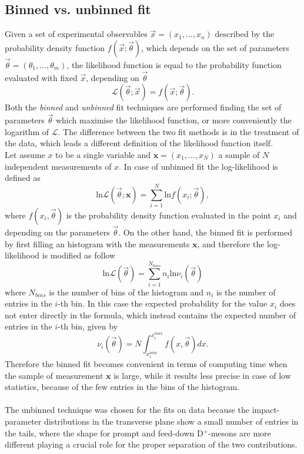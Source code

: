 \documentclass[b5paper,10pt,twoside,oldstyle,classica]{toptesi}
\begin{document}
\subsection{Binned vs. unbinned fit}
Given a set of experimental observables $\vec{x}=(x_1,...,x_n)$ described by the probability density function $f(\vec{x}; \vec{\theta})$, which depends on the set of parameters $\vec{\theta} = (\theta_1,...,\theta_m)$, the likelihood function is equal to the probability function evaluated with fixed $\vec{x}$, depending on $\vec{\theta}$
\begin{equation}
 \mathcal{L}(\vec{\theta}; \vec{x}) = f(\vec{x}; \vec{\theta}).
\end{equation}
Both the \textit{binned} and \textit{unbinned} fit techniques are performed finding the set of parameters $\vec{\theta}$ which maximise the likelihood function, or more conveniently the logarithm of $\mathcal{L}$. 
The difference between the two fit methods is in the treatment of the data, which leads a different definition of the likelihood function itself.\\ Let assume $x$ to be a single variable and $\pmb{x}=(x_1,...,x_N)$ a sample of $N$ independent measurements of $x$. In case of unbinned fit the log-likelihood is defined as
\begin{equation}
\text{ln}\mathcal{L}(\vec{\theta}; \pmb{x}) = \sum_{i=1}^{N} \text{ln}f(x_i; \vec{\theta}),
\end{equation}
where $f(x_i,\vec{\theta})$ is the probability density function evaluated in the point $x_i$ and depending on the parameters $\vec{\theta}$.
On the other hand, the binned fit is performed by first filling an histogram with the measurements $\pmb{x}$, and therefore the log-likelihood is modified as follow
\begin{equation}
 \text{ln}\mathcal{L}(\vec{\theta}) = \sum_{i=1}^{N_{bins}} n_i\text{ln}\nu_i(\vec{\theta})
\end{equation}
where $N_{bins}$ is the number of bins of the histogram and $n_i$ is the number of entries in the $i$-th bin. In this case the expected probability for the value $x_i$ does not enter directly in the formula, which instead contains the expected number of entries in the $i$-th bin, given by
\begin{equation}
 \nu_i(\vec{\theta}) = N\int_{x_i^{min}}^{x_i^{max}}f(x,\vec{\theta})dx.
\end{equation}
Therefore the binned fit becomes convenient in terms of computing time when the sample of measurement $\pmb{x}$ is large, while it results less precise in case of low statistics, because of the few entries in the bins of the histogram.\\\\
The unbinned technique was chosen for the fits on data because the impact-parameter distributions in the transverse plane show a small number of entries in the tails, where the shape for prompt and feed-down D$^+$-mesons are more different playing a crucial role for the proper separation of the two contributions.  
\end{document}
